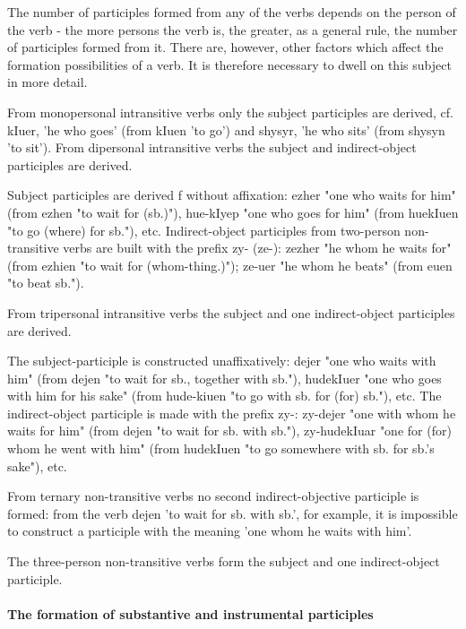 \documentclass[a4paper,12pt]{book}
\newcommand{\1}[1]{\textbf{\emph{#1}}} %
\newcommand{\2}[1]{\textbf{[#1]}} %
\newcommand{\3}[1]{\fontsize{11pt}{0cm}\textbf{\emph{#1}}} %
\newcommand{\4}[1]{\fontsize{10pt}{0cm}\emph{#1}}	%
\newcommand{\5}[1]{\textbf{/#1/}} %
\newcommand{\6}[1]{\textbf{[#1]}} %
\newcommand{\7}[1]{\fontsize{12pt}{0cm}\emph{#1}} %
\newcommand{\8}[1]{\fontsize{12pt}{0cm}`#1'} %
\newcommand{\9}[1]{\fontsize{12pt}{0cm}(lit. `#1')} %
\begin{document}
The number of participles formed from any of the verbs depends on the person of the verb - the more persons the verb is, the greater, as a general rule, the number of participles formed from it. There are, however, other factors which affect the formation possibilities of a verb. It is therefore necessary to dwell on this subject in more detail.

\begin{xlist}
\ex From monopersonal intransitive verbs only the subject participles are derived, cf. kIuer, 'he who goes' (from kIuen 'to go') and shysyr, 'he who sits' (from shysyn 'to sit').
\ex From dipersonal intransitive verbs the subject and indirect-object participles are derived.
	\begin{xlist}
	\ex Subject participles are derived f without affixation: ezher "one who waits for him" (from ezhen "to wait for (sb.)"), hue-kIyep "one who goes for him" (from huekIuen "to go (where) for sb."), etc.
	\ex Indirect-object participles from two-person non-transitive verbs are built with the prefix zy- (ze-): zezher "he whom he waits for" (from ezhien "to wait for (whom-thing.)"); ze-uer "he whom he beats" (from euen "to beat sb.").
	\end{xlist}
\ex From tripersonal intransitive verbs the subject and one indirect-object participles are derived.
	\begin{xlist}
	\ex The subject-participle is constructed unaffixatively: dejer "one who waits with him" (from dejen "to wait for sb., together with sb."), hudekIuer "one who goes with him for his sake" (from hude-kiuen "to go with sb. for (for) sb."), etc.
	\ex The indirect-object participle is made with the prefix zy-: zy-dejer "one with whom he waits for him" (from dejen "to wait for sb. with sb."), zy-hudekIuar "one for (for) whom he went with him" (from hudekIuen "to go somewhere with sb. for sb.'s sake"), etc.
	\end{xlist}
	From ternary non-transitive verbs no second indirect-objective participle is formed: from the verb dejen 'to wait for sb. with sb.', for example, it is impossible to construct a participle with the meaning 'one whom he waits with him'.
\end{xlist}

The three-person non-transitive verbs form the subject and one indirect-object participle.


\paragraph{The formation of substantive and instrumental participles}
\end{document}
